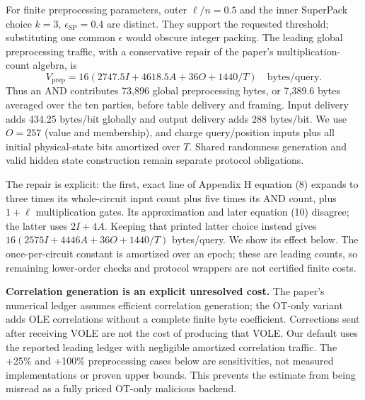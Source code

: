 For finite preprocessing parameters, outer $\ell/n=0.5$ and the inner SuperPack
choice $k=3$, $\epsilon_{\mathrm{SP}}=0.4$ are distinct. They support the requested
threshold; substituting one common $\epsilon$ would obscure integer packing.
The leading global preprocessing traffic, with a conservative repair of the
paper's multiplication-count algebra, is
\[
 V_{\mathrm{prep}}=16(2747.5I+4618.5A+36O+1440/T)
 \quad\text{bytes/query.}
\]
Thus an AND contributes 73,896 global preprocessing bytes, or 7,389.6 bytes
averaged over the ten parties, before table delivery and framing. Input delivery
adds 434.25 bytes/bit globally and output delivery adds 288 bytes/bit. We use
$O=257$ (value and membership), and charge query/position inputs plus all initial
physical-state bits amortized over $T$. Shared randomness generation and valid
hidden state construction remain separate protocol obligations.

The repair is explicit: the first, exact line of Appendix H equation (8)
expands to three times its whole-circuit input count plus five times its AND
count, plus $1+\ell$ multiplication gates. Its approximation and later
equation (10) disagree; the latter uses $2I+4A$. Keeping that printed latter
choice instead gives $16(2575I+4446A+36O+1440/T)$ bytes/query. We show its effect below.
The once-per-circuit constant is amortized over an epoch; these are leading
counts, so remaining lower-order checks and protocol wrappers are not certified
finite costs.

\textbf{Correlation generation is an explicit unresolved cost.} The paper's
numerical ledger assumes efficient correlation generation; the OT-only variant
adds OLE correlations without a complete finite byte coefficient. Corrections
sent after receiving VOLE are not the cost of producing that VOLE. Our default
uses the reported leading ledger with negligible amortized correlation traffic.
The +25\% and +100\% preprocessing cases below are sensitivities, not measured
implementations or proven upper bounds. This prevents the estimate from being
misread as a fully priced OT-only malicious backend.


